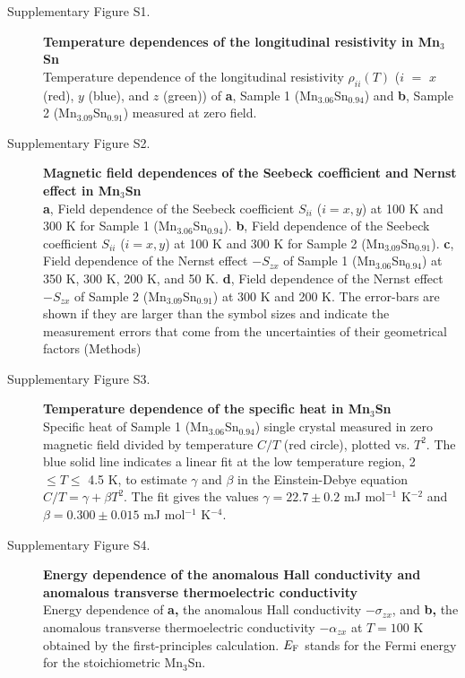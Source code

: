 \documentclass[amsmath,amssymb]{nature}
\begin{document}
	\begin{description}
		
		\item[Supplementary Figure S1.]
		{\bf Temperature dependences of the longitudinal resistivity in Mn$_3$Sn}\\  Temperature dependence of the longitudinal resistivity $\rho_{ii}(T)$ ($i$ $=$ $x$ (red), $y$ (blue), and   $z$ (green)) of {\bf{a}}, Sample 1 (Mn$_{3.06}$Sn$_{0.94}$) and {\bf{b}},  Sample 2 (Mn$_{3.09}$Sn$_{0.91}$) measured at zero field.\color{black}
		
		\item[Supplementary Figure S2.]
		{\bf Magnetic field dependences of the Seebeck coefficient and Nernst effect in Mn$_3$Sn}\\  {\bf{a}}, Field dependence of the Seebeck coefficient $S_{ii}$ ($ i= x, y$) at 100 K and 300 K for Sample 1 (Mn$_{3.06}$Sn$_{0.94}$). {\bf{b}}, Field dependence of the Seebeck coefficient $S_{ii}$ ($ i= x, y$) at 100 K and 300 K for Sample 2 (Mn$_{3.09}$Sn$_{0.91}$). {\bf{c}}, Field dependence of the Nernst effect $-S_{zx}$ of Sample 1 (Mn$_{3.06}$Sn$_{0.94}$) at 350 K, 300 K, 200 K, and 50 K. {\bf{d}}, Field dependence of the Nernst effect $-S_{zx}$ of Sample 2 (Mn$_{3.09}$Sn$_{0.91}$) at 300 K and 200 K. The error-bars are shown if they are larger than the symbol sizes and indicate the measurement errors that come from the uncertainties of their geometrical factors (Methods)
		
		
		\item[Supplementary Figure S3.]
		{\bf Temperature dependence of the specific heat in Mn$_3$Sn}\\  Specific heat of  Sample 1 (Mn$_{3.06}$Sn$_{0.94}$) single crystal \color{black} measured in zero magnetic field divided by temperature $C/T$ (red circle), plotted vs. $T^2$. The blue solid line indicates a linear fit at the low temperature region, 2 $\le T \le$ 4.5 K, to estimate $\gamma$ and $\beta$ in the Einstein-Debye equation $C/T=\gamma+\beta T^2$. The fit gives the values $\gamma=22.7 \pm 0.2$ mJ mol$^{-1}$ K$^{-2}$ and $\beta=0.300 \pm 0.015$ mJ mol$^{-1}$ K$^{-4}$.
		
		\item[Supplementary Figure S4.]
		{\bf Energy dependence of the anomalous Hall conductivity and anomalous transverse thermoelectric conductivity}\\   Energy dependence of {\bf{a},} the anomalous Hall conductivity $-\sigma_{zx}$, and {\bf{b},}  the anomalous transverse thermoelectric conductivity $-\alpha_{zx}$ at $T=100$ K obtained by the first-principles calculation. $E_{\rm F}$ stands for the Fermi energy for the stoichiometric Mn$_3$Sn. %
		

\end{description}
\end{document}
